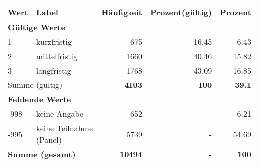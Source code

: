      \begin{longtable}{lXrrr}
     \toprule
     \textbf{Wert} & \textbf{Label} & \textbf{Häufigkeit} & \textbf{Prozent(gültig)} & \textbf{Prozent} \\
     \endhead
     \midrule
     \multicolumn{5}{l}{\textbf{Gültige Werte}}\\

     1 &
     \multicolumn{1}{X}{ kurzfristig   } &


       \num{675} &
       \num[round-mode=places,round-precision=2]{16.45} &
         \num[round-mode=places,round-precision=2]{6.43} \\

     2 &
     \multicolumn{1}{X}{ mittelfristig   } &


       \num{1660} &
       \num[round-mode=places,round-precision=2]{40.46} &
         \num[round-mode=places,round-precision=2]{15.82} \\

     3 &
     \multicolumn{1}{X}{ langfristig   } &


       \num{1768} &
       \num[round-mode=places,round-precision=2]{43.09} &
         \num[round-mode=places,round-precision=2]{16.85} \\
     \midrule
     \multicolumn{2}{l}{Summe (gültig)} &
       \textbf{\num{4103}} &
     \textbf{\num{100}} &
       \textbf{\num[round-mode=places,round-precision=2]{39.1}} \\
     \multicolumn{5}{l}{\textbf{Fehlende Werte}}\\
       -998 &
       keine Angabe &
         \num{652} &
        - &
         \num[round-mode=places,round-precision=2]{6.21} \\
       -995 &
       keine Teilnahme (Panel) &
         \num{5739} &
        - &
         \num[round-mode=places,round-precision=2]{54.69} \\
     \midrule
     \multicolumn{2}{l}{\textbf{Summe (gesamt)}} &
          \textbf{\num{10494}} &
        \textbf{-} &
        \textbf{\num{100}} \\
     \bottomrule
     \end{longtable}
     
